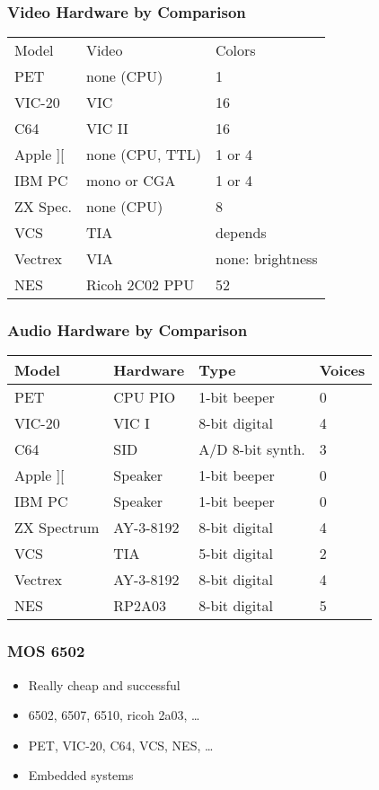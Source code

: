 \documentclass{beamer}
\begin{document}
\begin{frame}
\frametitle{Video Hardware by Comparison}

\begin{tabular}{|l|l|l|}
\hline Model & Video & Colors \\
PET & none (CPU) & 1 \\
VIC-20 & VIC & 16 \\
C64 & VIC II & 16 \\
Apple ][ & none (CPU, TTL) & 1 or 4 \\
IBM PC & mono or CGA & 1 or 4 \\
ZX Spec. & none (CPU) & 8 \\ \hline
VCS & TIA & depends \\
Vectrex & VIA & none: brightness \\
NES & Ricoh 2C02 PPU & 52 \\ \hline
\end{tabular}

\end{frame}


\begin{frame}
\frametitle{Audio Hardware by Comparison}

\begin{tabular}{|l|l|l|l|}
\hline Model & Hardware & Type & Voices \\ \hline
PET & CPU PIO & 1-bit beeper & 0 \\
VIC-20 & VIC I & 8-bit digital & 4 \\
C64 & SID & A/D 8-bit synth. & 3 \\ \hline
Apple ][ & Speaker & 1-bit beeper & 0 \\
IBM PC & Speaker & 1-bit beeper & 0 \\
ZX Spectrum & AY-3-8192 & 8-bit digital & 4 \\ \hline
VCS & TIA & 5-bit digital & 2 \\
Vectrex & AY-3-8192 & 8-bit digital & 4 \\
NES & RP2A03 & 8-bit digital & 5 \\ \hline
\end{tabular}

\end{frame}


\begin{frame}
\frametitle{MOS 6502}

\begin{itemize}
\item Really cheap and successful
\item 6502, 6507, 6510, ricoh 2a03, \dots
\item PET, VIC-20, C64, VCS, NES, \dots
\item Embedded systems
\end{itemize}

\end{frame}
\end{document}
